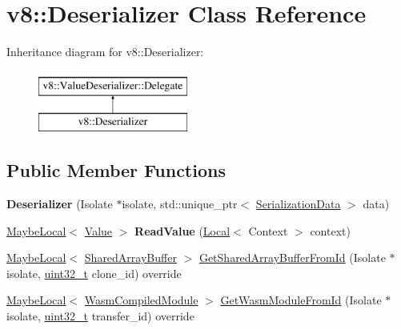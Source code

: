 \hypertarget{classv8_1_1Deserializer}{}\section{v8\+:\+:Deserializer Class Reference}
\label{classv8_1_1Deserializer}
Inheritance diagram for v8\+:\+:Deserializer\+:\begin{figure}[H]
\begin{center}
\leavevmode
\includegraphics[height=2.000000cm]{classv8_1_1Deserializer}
\end{center}
\end{figure}
\subsection*{Public Member Functions}
\begin{DoxyCompactItemize}
\item 
\mbox{\label{classv8_1_1Deserializer_a4f08262812387a2eec174b211a9a391f}} 
{\bfseries Deserializer} (Isolate $\ast$isolate, std\+::unique\+\_\+ptr$<$ \mbox{\hyperlink{classv8_1_1SerializationData}{Serialization\+Data}} $>$ data)
\item 
\mbox{\label{classv8_1_1Deserializer_aa42930b466c15faee0993f586eaa59ec}} 
\mbox{\hyperlink{classv8_1_1MaybeLocal}{Maybe\+Local}}$<$ \mbox{\hyperlink{classv8_1_1Value}{Value}} $>$ {\bfseries Read\+Value} (\mbox{\hyperlink{classv8_1_1Local}{Local}}$<$ Context $>$ context)
\item 
\mbox{\hyperlink{classv8_1_1MaybeLocal}{Maybe\+Local}}$<$ \mbox{\hyperlink{classv8_1_1SharedArrayBuffer}{Shared\+Array\+Buffer}} $>$ \mbox{\hyperlink{classv8_1_1Deserializer_a2a0c866dd14f5482bf5e131dcd181bd5}{Get\+Shared\+Array\+Buffer\+From\+Id}} (Isolate $\ast$isolate, \mbox{\hyperlink{classuint32__t}{uint32\+\_\+t}} clone\+\_\+id) override
\item 
\mbox{\hyperlink{classv8_1_1MaybeLocal}{Maybe\+Local}}$<$ \mbox{\hyperlink{classv8_1_1WasmCompiledModule}{Wasm\+Compiled\+Module}} $>$ \mbox{\hyperlink{classv8_1_1Deserializer_ad120ac7532b6965d9cefdef29f971661}{Get\+Wasm\+Module\+From\+Id}} (Isolate $\ast$isolate, \mbox{\hyperlink{classuint32__t}{uint32\+\_\+t}} transfer\+\_\+id) override
\end{DoxyCompactItemize}


